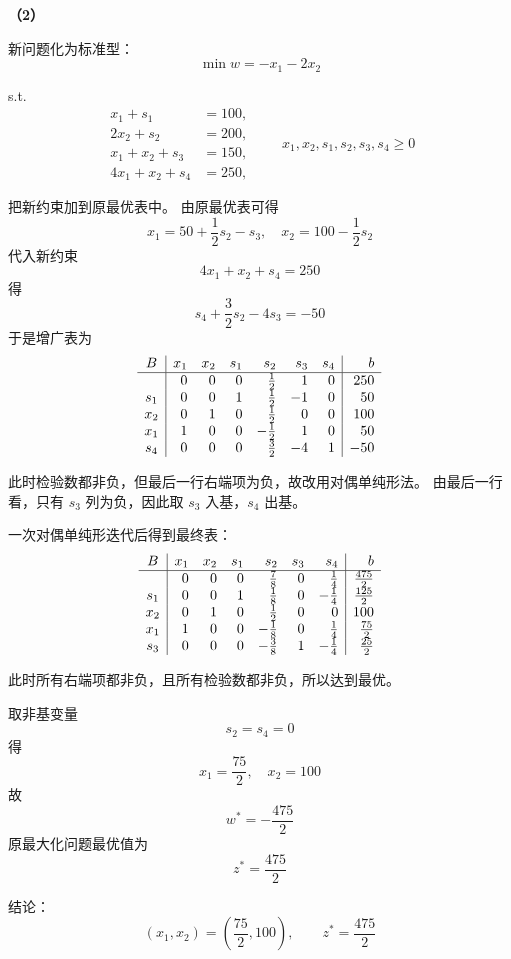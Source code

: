 \documentclass[12pt,a4paper]{article}
\begin{document}
\textbf{（2）}

新问题化为标准型：
\[
\min w=-x_1-2x_2
\]

s.t.
\[
\begin{aligned}
x_1+s_1&=100,\\
2x_2+s_2&=200,\\
x_1+x_2+s_3&=150,\\
4x_1+x_2+s_4&=250,
\end{aligned}
\qquad x_1,x_2,s_1,s_2,s_3,s_4\ge 0
\]






把新约束加到原最优表中。
由原最优表可得
\[
x_1=50+\frac12 s_2-s_3,\quad x_2=100-\frac12 s_2
\]
代入新约束
\[
4x_1+x_2+s_4=250
\]
得
\[
s_4+\frac32 s_2-4s_3=-50
\]
于是增广表为
\[
\begin{array}{c|rrrrrr|r}
B & x_1&x_2&s_1&s_2&s_3&s_4&b\\
\hline
  & 0&0&0&\frac12&1&0&250\\
s_1&0&0&1&\frac12&-1&0&50\\
x_2&0&1&0&\frac12&0&0&100\\
x_1&1&0&0&-\frac12&1&0&50\\
s_4&0&0&0&\frac32&-4&1&-50
\end{array}
\]

此时检验数都非负，但最后一行右端项为负，故改用对偶单纯形法。
由最后一行看，只有 $s_3$ 列为负，因此取 $s_3$ 入基，$s_4$ 出基。

一次对偶单纯形迭代后得到最终表：
\[
\begin{array}{c|rrrrrr|r}
B & x_1&x_2&s_1&s_2&s_3&s_4&b\\
\hline
  & 0&0&0&\frac78&0&\frac14&\frac{475}{2}\\
s_1&0&0&1&\frac18&0&-\frac14&\frac{125}{2}\\
x_2&0&1&0&\frac12&0&0&100\\
x_1&1&0&0&-\frac18&0&\frac14&\frac{75}{2}\\
s_3&0&0&0&-\frac38&1&-\frac14&\frac{25}{2}
\end{array}
\]

此时所有右端项都非负，且所有检验数都非负，所以达到最优。

取非基变量
\[
s_2=s_4=0
\]
得
\[
x_1=\frac{75}{2},\quad x_2=100
\]
故
\[
w^*=-\frac{475}{2}
\]
原最大化问题最优值为
\[
z^*=\frac{475}{2}
\]

结论：
\[
(x_1,x_2)=\left(\frac{75}{2},100\right),\qquad z^*=\frac{475}{2}
\]
\end{document}
